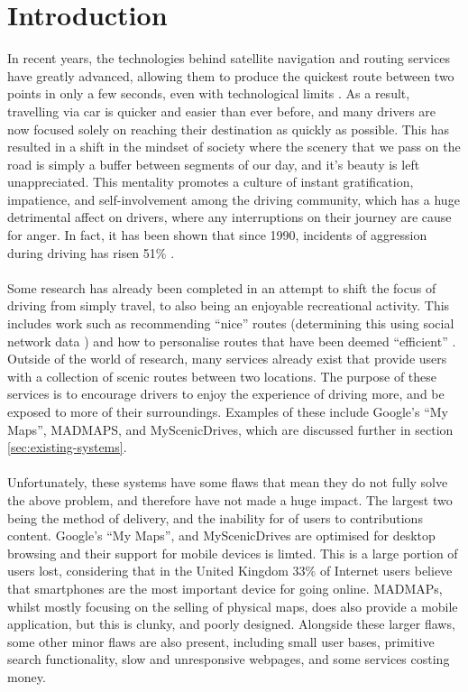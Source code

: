 \section{Introduction}
In recent years, the technologies behind satellite navigation and routing services have greatly advanced, allowing them to produce the quickest route between two points in only a few seconds, even with technological limits \cite{lou2009map}. As a result, travelling via car is quicker and easier than ever before, and many drivers are now focused solely on reaching their destination as quickly as possible. This has resulted in a shift in the mindset of society where the scenery that we pass on the road is simply a buffer between segments of our day, and it's beauty is left unappreciated. This mentality promotes a  culture of instant gratification, impatience, and self-involvement among the driving community, which has a huge detrimental affect on drivers, where any interruptions on their journey are cause for anger. In fact, it has been shown that since 1990, incidents of aggression during driving has risen 51\% \cite{vest1997road}. \ \\
\ \\
Some research has already been completed in an attempt to shift the focus of driving from simply travel, to also being an enjoyable recreational activity. This includes work such as recommending ``nice'' routes (determining this using social network data \cite{peregrino2012mapping}\cite{van2011time}\cite{quercia2014shortest}) and how to personalise routes that have been deemed ``efficient'' \cite{chen2011discovering}. Outside of the world of research, many services already exist that provide users with a collection of scenic routes between two locations. The purpose of these services is to encourage drivers to enjoy the experience of driving more, and be exposed to more of their surroundings. Examples of these include Google's ``My Maps''\cite{url2015gmaps}, MADMAPS\cite{url2015madmaps}, and MyScenicDrives\cite{url2015myscenicdrives}, which are discussed further in section \ref{sec:existing-systems}.\ \\
\ \\
Unfortunately, these systems have some flaws that mean they do not fully solve the above problem, and therefore have not made a huge impact. The largest two being the method of delivery, and the inability for of users to contributions content. Google's ``My Maps'', and MyScenicDrives are optimised for desktop browsing and their support for mobile devices is limted. This is a large portion of users lost, considering that in the United Kingdom 33\% of Internet users believe that smartphones are the most important device for going online\cite{ofcom2015comms}. MADMAPs, whilst mostly focusing on the selling of physical maps, does also provide a mobile application, but this is clunky, and poorly designed. Alongside these larger flaws, some other minor flaws are also present, including small user bases, primitive search functionality, slow and unresponsive webpages, and some services costing money.\ \\
